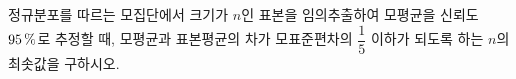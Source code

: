 정규분포를 따르는 모집단에서 크기가 $n$인 표본을 임의추출하여 모평균을 신뢰도 $95\mkern3mu \%$로 추정할 때, 모평균과 표본평균의 차가 모표준편차의 $\dfrac{1}{5}$ 이하가 되도록 하는 $n$의 최솟값을 구하시오. 
